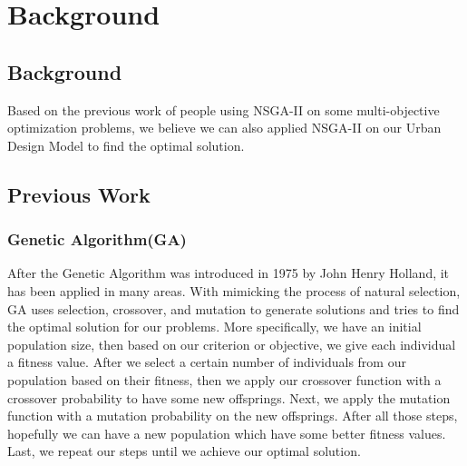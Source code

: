 \chapter{Background}
\label{chap:background}

\section{Background}
Based on the previous work of people using NSGA-II on some multi-objective optimization problems\cite{Magnier_2010_Multiobjective}, we believe we can also applied NSGA-II on our Urban Design Model to find the optimal solution. 

\section{Previous Work}

\subsection{Genetic Algorithm(GA)}
After the Genetic Algorithm was introduced in 1975 by John Henry Holland\cite{Holland_1975_Book}, it has been applied in many areas. With mimicking the process of natural selection, GA uses selection, crossover, and mutation to generate solutions and tries to find the optimal solution for our problems. More specifically, we have an initial population size, then based on our criterion or objective, we give each individual a fitness value. After we select a certain number of individuals from our population based on their fitness, then we apply our crossover function with a crossover probability to have some new offsprings. Next, we apply the mutation function with a mutation probability on the new offsprings. After all those steps, hopefully we can  have a new population which have some better fitness values. Last, we repeat our steps until we achieve our optimal solution.

